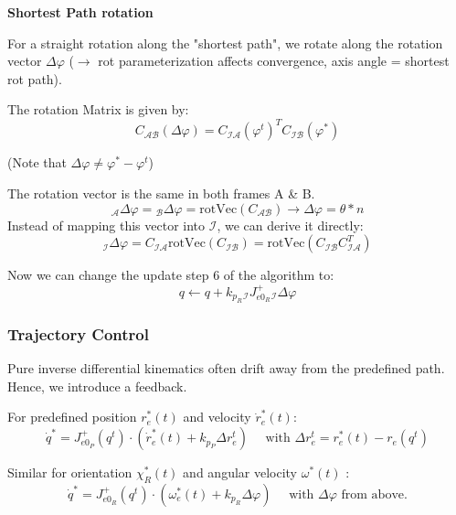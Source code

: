 \documentclass[fontsize=6pt,DIV=calc,a4paper,ngerman]{scrartcl}
\begin{document}
\begin{multicols*}{4}
	\smallskip
	\textbf{Shortest Path rotation}

	For a straight rotation along the "shortest path", we rotate along the rotation vector $\Delta \varphi$ ($\rightarrow$ rot parameterization affects convergence, axis angle = shortest rot path).

	The rotation Matrix is given by: $$C_\mathcal{AB}(\Delta\varphi)=C_\mathcal{IA}(\varphi^t)^TC_\mathcal{IB}(\varphi^*)$$
	\begin{flushright}(Note that $\Delta\varphi \neq \varphi^*-\varphi^t$)\end{flushright}
	The rotation vector is the same in both frames A \& B. $${}_\mathcal{A}\Delta\varphi = {}_\mathcal{B}\Delta\varphi = \text{rotVec}(C_\mathcal{AB}) \rightarrow \Delta \varphi = \theta * n$$
	Instead of mapping this vector into $\mathcal{I}$, we can derive it directly:
	$${}_\mathcal{I}\Delta\varphi = C_\mathcal{IA} \text{rotVec}(C_\mathcal{IB}) =  \text{rotVec}(C_\mathcal{IB}C_\mathcal{IA}^T)$$

	Now we can change the update step 6 of the algorithm to:
	$$q \leftarrow q + k_{p_R}{}_\mathcal{I}J^+_{e0_R}{}_\mathcal{I}\Delta\varphi$$


	\subsubsection{Trajectory Control}
	Pure inverse differential kinematics often drift away from the predefined path. Hence, we introduce a feedback.

	For predefined position $r_e^*(t)$ and velocity $\dot{r}_e^*(t)$:
	$$\dot{q}^*= J_{e0_P}^+(q^t)\cdot (\dot{r}_e^*(t) + k_{p_P}\Delta r^t_e) \quad \text{ with } \Delta r^t_e = r^*_e(t) -r_e(q^t)$$

	Similar for orientation $\chi_R^*(t)$ and angular velocity $\omega^*(t)$ :
	$$\dot{q}^*= J_{e0_R}^+(q^t)\cdot (\omega_e^*(t) + k_{p_R}\Delta\varphi) \quad \text{ with } \Delta\varphi \text{ from above.}$$



\end{multicols*}
\end{document}
